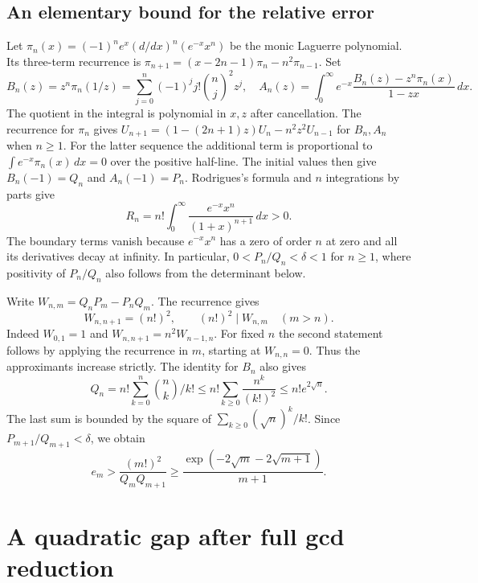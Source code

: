 \documentclass[11pt,a4paper,oneside,openany]{report}
\theoremstyle{remark}\newtheorem{remark}[theorem]{Remark}
\numberwithin{equation}{section}
\begin{document}
\subsection{An elementary bound for the relative error}

Let $\pi_n(x)=(-1)^n e^x(d/dx)^n(e^{-x}x^n)$ be the monic Laguerre
polynomial. Its three-term recurrence is
$\pi_{n+1}=(x-2n-1)\pi_n-n^2\pi_{n-1}$. Set
\[
 B_n(z)=z^n\pi_n(1/z)
       =\sum_{j=0}^n(-1)^j j!\binom nj^2 z^j,\quad
 A_n(z)=\int_0^\infty e^{-x}
          \frac{B_n(z)-z^n\pi_n(x)}{1-zx}\,dx.
\]
The quotient in the integral is polynomial in $x,z$ after cancellation.
The recurrence for $\pi_n$ gives
$U_{n+1}=(1-(2n+1)z)U_n-n^2z^2U_{n-1}$ for $B_n,A_n$ when
$n\ge1$. For the latter sequence the additional term is proportional
to $\int e^{-x}\pi_n(x)\,dx=0$ over the positive half-line.
The initial values then give $B_n(-1)=Q_n$ and $A_n(-1)=P_n$.
Rodrigues's formula and $n$ integrations by parts give
\begin{equation}\label{ch1:eq:gomp-raw}
  R_n=n!\int_0^\infty\frac{e^{-x}x^n}{(1+x)^{n+1}}\,dx>0.
\end{equation}
The boundary terms vanish because $e^{-x}x^n$ has a zero of order $n$
at zero and all its derivatives decay at infinity. In particular,
$0<P_n/Q_n<\delta<1$ for $n\ge1$, where positivity of $P_n/Q_n$
also follows from the determinant below.

Write $W_{n,m}=Q_nP_m-P_nQ_m$. The recurrence gives
\begin{equation}\label{ch1:eq:gomp-wronskian}
 W_{n,n+1}=(n!)^2,\qquad
 (n!)^2\mid W_{n,m}\quad(m>n).
\end{equation}
Indeed $W_{0,1}=1$ and $W_{n,n+1}=n^2 W_{n-1,n}$. For fixed $n$
the second statement follows by applying the recurrence in $m$,
starting at $W_{n,n}=0$. Thus the approximants increase strictly.
The identity for $B_n$ also gives
\[
  Q_n=n!\sum_{k=0}^n \binom nk/k!
  \le n!\sum_{k\ge0}\frac{n^k}{(k!)^2}\le n!e^{2\sqrt n}.
\]
The last sum is bounded by the square of $\sum_{k\ge0}(\sqrt n)^k/k!$.
Since $P_{m+1}/Q_{m+1}<\delta$, we obtain
\begin{equation}\label{ch1:eq:gomp-relative}
 e_m>\frac{(m!)^2}{Q_mQ_{m+1}}
 \ge\frac{\exp(-2\sqrt m-2\sqrt{m+1})}{m+1}.
\end{equation}

\section{A quadratic gap after full gcd reduction}
\label{ch1:sec:gomp-gap}
\end{document}
